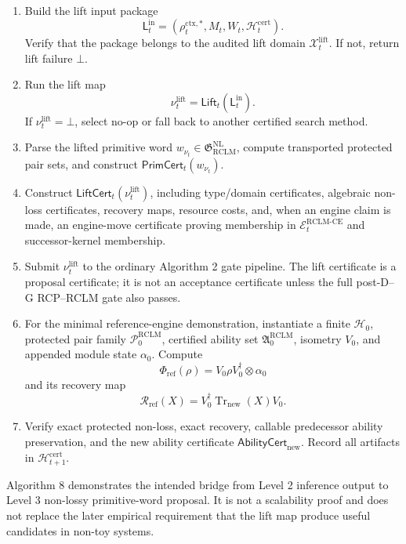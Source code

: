 \documentclass[11pt,a4paper]{article}
\newcommand{\Hcal}{\mathcal H}
\newcommand{\Pcal}{\mathcal P}
\newcommand{\Xcal}{\mathcal X}
\newcommand{\Tr}{\operatorname{Tr}}
\newcommand{\RCLM}{\mathrm{RCLM}}
\newcommand{\ctx}{\mathrm{ctx}}
\newcommand{\cert}{\mathrm{cert}}
\newcommand{\NL}{\mathrm{NL}}
\newcommand{\CE}{\mathrm{CE}}
\begin{document}
\begin{enumerate}[leftmargin=1.5em]
    \item Build the lift input package
    \[
    \mathsf L_t^{\mathrm{in}}=(\rho_t^{\ctx,*},M_t,W_t,\mathcal H_t^{\cert}).
    \]
    Verify that the package belongs to the audited lift domain \(\Xcal_t^{\mathrm{lift}}\).  If not, return lift failure \(\bot\).
    \item Run the lift map
    \[
    \nu_t^{\mathrm{lift}}=\mathsf{Lift}_t(\mathsf L_t^{\mathrm{in}}).
    \]
    If \(\nu_t^{\mathrm{lift}}=\bot\), select no-op or fall back to another certified search method.
    \item Parse the lifted primitive word \(w_{\nu_t}\in\mathfrak G_{\RCLM}^{\NL}\), compute transported protected pair sets, and construct \(\mathsf{PrimCert}_t(w_{\nu_t})\).
    \item Construct \(\mathsf{LiftCert}_t(\nu_t^{\mathrm{lift}})\), including type/domain certificates, algebraic non-loss certificates, recovery maps, resource costs, and, when an engine claim is made, an engine-move certificate proving membership in \(\mathcal E_t^{\RCLM\text{-}\CE}\) and successor-kernel membership.
    \item Submit \(\nu_t^{\mathrm{lift}}\) to the ordinary Algorithm 2 gate pipeline.  The lift certificate is a proposal certificate; it is not an acceptance certificate unless the full post-D--G RCP--RCLM gate also passes.
    \item For the minimal reference-engine demonstration, instantiate a finite \(\Hcal_0\), protected pair family \(\Pcal_0^{\RCLM}\), certified ability set \(\mathfrak A_0^{\RCLM}\), isometry \(V_0\), and appended module state \(\alpha_0\).  Compute
    \[
    \Phi_{\mathrm{ref}}(\rho)=V_0\rho V_0^\dagger\otimes\alpha_0
    \]
    and its recovery map
    \[
    \mathcal R_{\mathrm{ref}}(X)=V_0^\dagger\Tr_{\mathrm{new}}(X)V_0.
    \]
    \item Verify exact protected non-loss, exact recovery, callable predecessor ability preservation, and the new ability certificate \(\mathsf{AbilityCert}_{\mathrm{new}}\).  Record all artifacts in \(\mathcal H_{t+1}^{\cert}\).
\end{enumerate}


Algorithm 8 demonstrates the intended bridge from Level 2 inference output to Level 3 non-lossy primitive-word proposal.  It is not a scalability proof and does not replace the later empirical requirement that the lift map produce useful candidates in non-toy systems.
\end{document}
